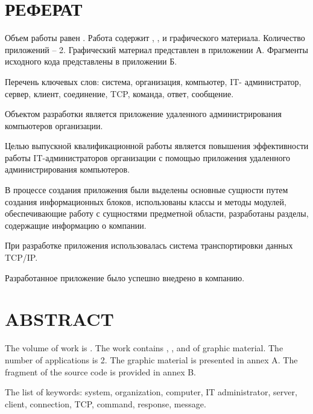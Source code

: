 \newsection
\section*{РЕФЕРАТ}

Объем работы равен . Работа содержит , ,  и  графического материала. Количество приложений – 2. Графический материал представлен в приложении А. Фрагменты исходного кода представлены в приложении Б.

Перечень ключевых слов: система, организация, компьютер, IT- администратор, сервер, клиент, соединение, TCP, команда, ответ, сообщение.

Объектом разработки является приложение удаленного администрирования компьютеров организации.

Целью выпускной квалификационной работы является \linebreak повышения эффективности работы IT-администраторов организации с помощью приложения удаленного администрирования компьютеров.

В процессе создания приложения были выделены основные сущности путем создания информационных блоков, использованы классы и методы модулей, обеспечивающие работу с сущностями предметной области, разработаны разделы, содержащие информацию о компании.

При разработке приложения использовалась система транспортировки данных TCP/IP.

Разработанное приложение было успешно внедрено в компанию.
\newpage
{}
\section*{ABSTRACT}
  
The volume of work is . The work contains , ,  and  of graphic material. The number of applications is 2. The graphic material is presented in annex A. The fragment of the source code is provided in annex B.

The list of keywords: system, organization, computer, IT administrator, server, client, connection, TCP, command, response, message.

